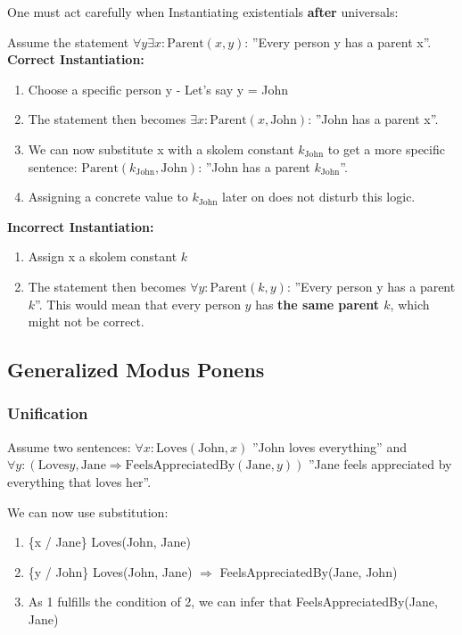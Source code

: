 \documentclass[
../../EiKI_Summary.tex,
]
{subfiles}
\begin{document}
One must act carefully when Instantiating existentials \textbf{after} universals:

Assume the statement $\forall y \exists x: \text{Parent}(x, y)$: ''Every person y has a parent x''.\\

\textbf{Correct Instantiation:}
\begin{enumerate}
    \item Choose a specific person y - Let's say y = John
    \item The statement then becomes $\exists x: \text{Parent}(x, \text{John})$: ''John has a parent x''.
    \item We can now substitute x with a skolem constant $k_{\text{John}}$ to get a more specific sentence: $\text{Parent}(k_{\text{John}}, \text{John})$: ''John has a parent $k_{\text{John}}$''.
    \item Assigning a concrete value to $k_{\text{John}}$ later on does not disturb this logic.
\end{enumerate}

\textbf{Incorrect Instantiation:}
\begin{enumerate}
    \item Assign x a skolem constant $k$
    \item The statement then becomes $\forall y: \text{Parent}(k, y)$: ''Every person y has a parent $k$''. This would mean that every person $y$ has \textbf{the same parent $k$}, which might not be correct. 
\end{enumerate}

\subsection{Generalized Modus Ponens}
\subsubsection{Unification}
Assume two sentences: $\forall x: \text{Loves}(\text{John}, x)$ ''John loves everything'' and $\forall y: (\text{Loves}{y,\text{Jane}} \Rightarrow \text{FeelsAppreciatedBy}(\text{Jane}, y))$ ''Jane feels appreciated by everything that loves her''.

We can now use substitution:
\begin{enumerate}
    \item \{x / Jane\} \rightarrow Loves(John, Jane)
    \item \{y / John\} \rightarrow Loves(John, Jane) $\Rightarrow$ FeelsAppreciatedBy(Jane, John)
    \item As 1 fulfills the condition of 2, we can infer that FeelsAppreciatedBy(Jane, Jane)
\end{enumerate}
\end{document}
